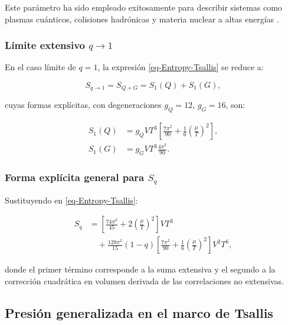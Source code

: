 Este parámetro ha sido empleado exitosamente para describir sistemas como plasmas cuánticos, colisiones hadrónicas y materia nuclear a altas energías \cite{Tsallis_2014, Bhattacharyya_2018, Barboza_Mendoza_2019}.

\subsubsection*{Límite extensivo \( q \to 1 \)}

En el caso límite de \( q = 1 \), la expresión \eqref{eq-Entropy-Tsallis} se reduce a:

\begin{equation}\label{eq-BG-limit}
S_{q \to 1} = S_{Q+G} = S_1(Q) + S_1(G),
\end{equation}

cuyas formas explícitas, con degeneraciones \( g_Q = 12 \), \( g_G = 16 \), son:

\begin{align}
S_1(Q) &= g_Q V T^3 \left[ \frac{7 \pi^2}{90} + \frac{1}{6} \left( \frac{\mu}{T} \right)^2 \right], \\
S_1(G) &= g_G V T^3 \frac{4 \pi^2}{90}.
\end{align}

\subsubsection*{Forma explícita general para \( S_q \)}

Sustituyendo en \eqref{eq-Entropy-Tsallis}:

\begin{equation}\label{eq-Tsallis-Entropy-final}
\begin{split}
S_q &= \left[ \frac{74 \pi^2}{45} + 2 \left( \frac{\mu}{T} \right)^2 \right] V T^3 \\
&\quad + \frac{128 \pi^2}{15} (1 - q) \left[ \frac{7 \pi^2}{90} + \frac{1}{6} \left( \frac{\mu}{T} \right)^2 \right] V^2 T^6,
\end{split}
\end{equation}

donde el primer término corresponde a la suma extensiva y el segundo a la corrección cuadrática en volumen derivada de las correlaciones no extensivas.

\subsection{Presión generalizada en el marco de Tsallis}
\label{subsec-Tsallis-pressure}

